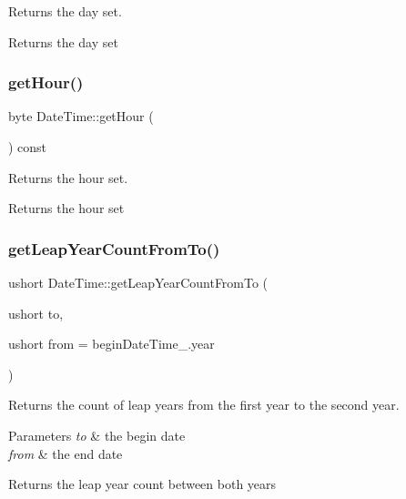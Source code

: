 Returns the day set. 

\begin{DoxyReturn}{Returns}
the day set 
\end{DoxyReturn}
\mbox{\label{class_date_time_ada00db60b48e636102d509a7b1b30296}} 
\subsubsection{\texorpdfstring{getHour()}{getHour()}}
{\footnotesize\ttfamily byte Date\+Time\+::get\+Hour (\begin{DoxyParamCaption}{ }\end{DoxyParamCaption}) const}



Returns the hour set. 

\begin{DoxyReturn}{Returns}
the hour set 
\end{DoxyReturn}
\mbox{\label{class_date_time_a8401d6a8ad1aec862f2a96bb9eda1870}} 
\subsubsection{\texorpdfstring{getLeapYearCountFromTo()}{getLeapYearCountFromTo()}}
{\footnotesize\ttfamily ushort Date\+Time\+::get\+Leap\+Year\+Count\+From\+To (\begin{DoxyParamCaption}\item[{ushort}]{to,  }\item[{ushort}]{from = {\ttfamily beginDateTime\+\_\+.year} }\end{DoxyParamCaption})\hspace{0.3cm}{\ttfamily [static]}}



Returns the count of leap years from the first year to the second year. 


\begin{DoxyParams}{Parameters}
{\em to} & the begin date \\
\hline
{\em from} & the end date \\
\hline
\end{DoxyParams}
\begin{DoxyReturn}{Returns}
the leap year count between both years 
\end{DoxyReturn}
\mbox{\label{class_date_time_afcecea2d24e906df99b9105c116262b3}} 

